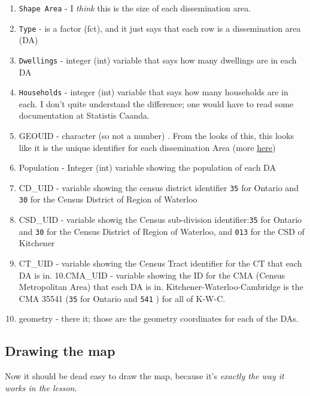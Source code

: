 \documentclass[
]{article}
\providecommand{\tightlist}{%
  \setlength{\itemsep}{0pt}\setlength{\parskip}{0pt}}
\begin{document}
\begin{enumerate}
\def\labelenumi{\arabic{enumi}.}
\tightlist
\item
  \texttt{Shape\ Area} - I \emph{think} this is the size of each
  dissemination area.
\item
  \texttt{Type} - is a factor (fct), and it just says that each row is a
  dissemination area (DA)
\item
  \texttt{Dwellings} - integer (int) variable that says how many
  dwellings are in each DA
\item
  \texttt{Households} - integer (int) variable that says how many
  households are in each. I don't quite understand the difference; one
  would have to read some documentation at Statistis Caanda.
\item
  GEOUID - character (so not a number) . From the looks of this, this
  looks like it is the unique identifier for each dissemination Area
  (more
  \href{https://www150.statcan.gc.ca/n1/pub/92f0138m/92f0138m2019001-eng.htm}{here})
\item
  Population - Integer (int) variable showing the population of each DA
\item
  CD\_UID - variable showing the census district identifier \texttt{35}
  for Ontario and \texttt{30} for the Census District of Region of
  Waterloo
\item
  CSD\_UID - variable showig the Census sub-division
  identifier:\texttt{35} for Ontario and \texttt{30} for the Census
  District of Region of Waterloo, and \texttt{013} for the CSD of
  Kitchener
\item
  CT\_UID - variable showing the Census Tract identifier for the CT that
  each DA is in. 10.CMA\_UID - variable showing the ID for the CMA
  (Census Metropolitan Area) that each DA is in.
  Kitchener-Waterloo-Cambridge is the CMA 35541 (\texttt{35} for Ontario
  and \texttt{541} ) for all of K-W-C.
\item
  geometry - there it; those are the geometry coordinates for each of
  the DAs.
\end{enumerate}

\hypertarget{drawing-the-map}{%
\subsection{Drawing the map}\label{drawing-the-map}}

Now it should be dead easy to draw the map, because it's \emph{exactly
the way it works in the lesson}.
\end{document}
